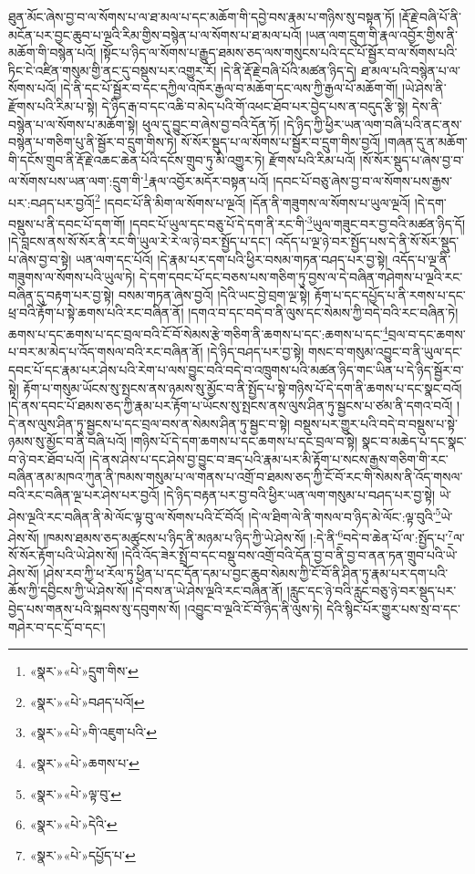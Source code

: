 ཐུན་མོང་ཞེས་བྱ་བ་ལ་སོགས་པ་ལ་ཐ་མལ་པ་དང་མཆོག་གི་དབྱེ་བས་རྣམ་པ་གཉིས་སུ་བསྟན་ཏོ། །རྡོ་རྗེ་བཞི་པོ་ནི་མངོན་པར་བྱང་ཆུབ་པ་ལྔའི་རིམ་གྱིས་བསྙེན་པ་ལ་སོགས་པ་ཐ་མལ་པའོ། །ཡན་ལག་དྲུག་གི་རྣལ་འབྱོར་གྱིས་ནི་མཆོག་གི་བསྙེན་པའོ། །སྟོང་པ་ཉིད་ལ་སོགས་པ་རྒྱུད་ཐམས་ཅད་ལས་གསུངས་པའི་དང་པོ་སྦྱོར་བ་ལ་སོགས་པའི་ཏིང་ངེ་འཛིན་གསུམ་གྱི་ནང་དུ་བསྡུས་པར་འགྱུར་རོ། །དེ་ནི་རྡོ་རྗེ་བཞི་པོའི་མཚན་ཉིད་དེ། ཐ་མལ་པའི་བསྙེན་པ་ལ་སོགས་པའོ། །དེ་ནི་དང་པོ་སྦྱོར་བ་དང་དཀྱིལ་འཁོར་རྒྱལ་བ་མཆོག་དང་ལས་ཀྱི་རྒྱལ་པོ་མཆོག་གོ། །ཡེ་ཤེས་ནི་རྫོགས་པའི་རིམ་པ་སྟེ། དེ་ཉིད་རྒ་བ་དང་འཆི་བ་མེད་པའི་གོ་འཕང་ཐོབ་པར་བྱེད་པས་ན་བདུད་རྩི་སྟེ། དེས་ནི་བསྙེན་པ་ལ་སོགས་པ་མཆོག་སྟེ། ཕུལ་དུ་བྱུང་བ་ཞེས་བྱ་བའི་དོན་ཏོ། །དེ་ཉིད་ཀྱི་ཕྱིར་ཡན་ལག་བཞི་པའི་ནང་ནས་བསྙེན་པ་གཅིག་པུ་ནི་སྦྱོར་བ་དྲུག་གིས་ཏེ། སོ་སོར་སྡུད་པ་ལ་སོགས་པ་སྦྱོར་བ་དྲུག་གིས་བྱའོ། །གཞན་དུ་ན་མཆོག་གི་དངོས་གྲུབ་ནི་རྡོ་རྗེ་འཆང་ཆེན་པོའི་དངོས་གྲུབ་ཏུ་མི་འགྱུར་ཏེ། རྫོགས་པའི་རིམ་པའོ། །སོ་སོར་སྡུད་པ་ཞེས་བྱ་བ་ལ་སོགས་པས་ཡན་ལག་:དྲུག་གི་\footnote{«སྣར་»«པེ་»དྲུག་གིས་}རྣལ་འབྱོར་མདོར་བསྟན་པའོ། །དབང་པོ་བཅུ་ཞེས་བྱ་བ་ལ་སོགས་པས་རྒྱས་པར་:བཤད་པར་བྱའོ།\footnote{«སྣར་»«པེ་»བཤད་པའོ།} །དབང་པོ་ནི་མིག་ལ་སོགས་པ་ལྔའོ། །དོན་ནི་གཟུགས་ལ་སོགས་པ་ཡུལ་ལྔའོ། །དེ་དག་བསྡུས་པ་ནི་དབང་པོ་དག་གོ། །དབང་པོ་ཡུལ་དང་བཅུ་པོ་དེ་དག་ནི་རང་གི་\footnote{«སྣར་»«པེ་»གི་འཇུག་པའི་}ཡུལ་གཟུང་བར་བྱ་བའི་མཚན་ཉིད་དོ། །དེ་བླངས་ནས་སོ་སོར་ནི་རང་གི་ཡུལ་རེ་རེ་ལ་ཉེ་བར་སྤྱོད་པ་དང་། འདོད་པ་ལྔ་ཉེ་བར་སྤྱོད་པས་དེ་ནི་སོ་སོར་སྡུད་པ་ཞེས་བྱ་བ་སྟེ། ཡན་ལག་དང་པོའོ། །དེ་རྣམ་པར་དག་པའི་ཕྱིར་བསམ་གཏན་བཤད་པར་བྱ་སྟེ། འདོད་པ་ལྔ་ནི་གཟུགས་ལ་སོགས་པའི་ཡུལ་ཏེ། དེ་དག་དབང་པོ་དང་བཅས་པས་གཅིག་ཏུ་བྱས་ལ་དེ་བཞིན་གཤེགས་པ་ལྔའི་རང་བཞིན་དུ་བརྟག་པར་བྱ་སྟེ། བསམ་གཏན་ཞེས་བྱའོ། །དེའི་ཡང་བྱེ་བྲག་ལྔ་སྟེ། རྟོག་པ་དང་དཔྱོད་པ་ནི་རགས་པ་དང་ཕྲ་བའི་རྟོག་པ་སྟེ་ཆགས་པའི་རང་བཞིན་ནོ། །དགའ་བ་དང་བདེ་བ་ནི་ལུས་དང་སེམས་ཀྱི་བདེ་བའི་རང་བཞིན་ཏེ། ཆགས་པ་དང་ཆགས་པ་དང་བྲལ་བའི་ངོ་བོ་སེམས་རྩེ་གཅིག་ནི་ཆགས་པ་དང་:ཆགས་པ་དང་\footnote{«སྣར་»«པེ་»ཆགས་པ་}བྲལ་བ་དང་ཆགས་པ་བར་མ་མེད་པ་འོད་གསལ་བའི་རང་བཞིན་ནོ། །དེ་ཉིད་བཤད་པར་བྱ་སྟེ། གསང་བ་གསུམ་འབྱུང་བ་ནི་ཡུལ་དང་དབང་པོ་དང་རྣམ་པར་ཤེས་པའི་རེག་པ་ལས་བྱུང་བའི་བདེ་བ་འཁྲུགས་པའི་མཚན་ཉིད་གང་ཡིན་པ་དེ་ཉིད་སྦྱོར་བ་སྟེ། རྟོག་པ་གསུམ་ཡོངས་སུ་སྤངས་ནས་ཉམས་སུ་མྱོང་བ་ནི་སྤྱོད་པ་སྟེ་གཉིས་པོ་དེ་དག་ནི་ཆགས་པ་དང་སྣང་བའོ། །དེ་ནས་དབང་པོ་ཐམས་ཅད་ཀྱི་རྣམ་པར་རྟོག་པ་ཡོངས་སུ་སྤངས་ནས་ལུས་ཤིན་ཏུ་སྦྱངས་པ་ཙམ་ནི་དགའ་བའོ། །དེ་ནས་ལུས་ཤིན་ཏུ་སྦྱངས་པ་དང་བྲལ་བས་ན་སེམས་ཤིན་ཏུ་སྦྱང་བ་སྟེ། བསྡུས་པར་གྱུར་པའི་བདེ་བ་བསྡུས་པ་སྟེ་ཉམས་སུ་མྱོང་བ་ནི་བཞི་པའོ། །གཉིས་པོ་དེ་དག་ཆགས་པ་དང་ཆགས་པ་དང་བྲལ་བ་སྟེ། སྣང་བ་མཆེད་པ་དང་སྣང་བ་ཉེ་བར་ཐོབ་པའོ། །དེ་ནས་ཤེས་པ་དང་ཤེས་བྱ་བྱུང་བ་ཟད་པའི་རྣམ་པར་མི་རྟོག་པ་སངས་རྒྱས་གཅིག་གི་རང་བཞིན་ནམ་མཁའ་ཀུན་ནི་ཁམས་གསུམ་པ་ལ་གནས་པ་འགྲོ་བ་ཐམས་ཅད་ཀྱི་ངོ་བོ་རང་གི་སེམས་ནི་འོད་གསལ་བའི་རང་བཞིན་ལྔ་པར་ཤེས་པར་བྱའོ། །དེ་ཉིད་བརྟན་པར་བྱ་བའི་ཕྱིར་ཡན་ལག་གསུམ་པ་བཤད་པར་བྱ་སྟེ། ཡེ་ཤེས་ལྔའི་རང་བཞིན་ནི་མེ་ལོང་ལྟ་བུ་ལ་སོགས་པའི་ངོ་བོའོ། །དེ་ལ་ཐིག་ལེ་ནི་གསལ་བ་ཉིད་མེ་ལོང་:ལྟ་བུའི་\footnote{«སྣར་»«པེ་»ལྟ་བུ་}ཡེ་ཤེས་སོ། །ཁམས་ཐམས་ཅད་མཚུངས་པ་ཉིད་ནི་མཉམ་པ་ཉིད་ཀྱི་ཡེ་ཤེས་སོ། །:དེ་ནི་\footnote{«སྣར་»«པེ་»དེའི་}བདེ་བ་ཆེན་པོ་ལ་:སྤྱོད་པ་\footnote{«སྣར་»«པེ་»དཔྱོད་པ་}ལ་སོ་སོར་རྟོག་པའི་ཡེ་ཤེས་སོ། །དེའི་འོད་ཟེར་སྤྲོ་བ་དང་བསྡུ་བས་འགྲོ་བའི་དོན་བྱ་བ་ནི་བྱ་བ་ནན་ཏན་གྲུབ་པའི་ཡེ་ཤེས་སོ། །ཤེས་རབ་ཀྱི་ཕ་རོལ་ཏུ་ཕྱིན་པ་དང་དོན་དམ་པ་བྱང་ཆུབ་སེམས་ཀྱི་ངོ་བོ་ནི་ཤིན་ཏུ་རྣམ་པར་དག་པའི་ཆོས་ཀྱི་དབྱིངས་ཀྱི་ཡེ་ཤེས་སོ། །དེ་བས་ན་ཡེ་ཤེས་ལྔའི་རང་བཞིན་ནོ། །རླུང་དང་ཉེ་བའི་རླུང་བཅུ་ཉེ་བར་སྡུད་པར་བྱེད་པས་གནས་པའི་སྐབས་སུ་དབུགས་སོ། །འབྱུང་བ་ལྔའི་ངོ་བོ་ཉིད་ནི་ལུས་ཏེ། དེའི་སྙིང་པོར་གྱུར་པས་སྲ་བ་དང་གཤེར་བ་དང་དྲོ་བ་དང་། 
